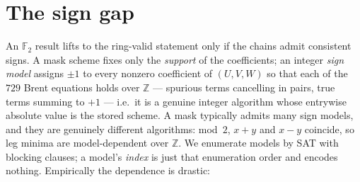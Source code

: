 \documentclass[11pt]{article}
\theoremstyle{definition}
\theoremstyle{remark}
\newcommand{\F}{\mathbb{F}}
\newcommand{\Z}{\mathbb{Z}}
\begin{document}
\section{The sign gap}\label{sec:signs}

An $\F_2$ result lifts to the ring-valid statement only if the
chains admit consistent signs.  A mask scheme fixes only the
\emph{support} of the coefficients; an integer \emph{sign model}
assigns $\pm1$ to every nonzero coefficient of $(U,V,W)$ so that each
of the $729$ Brent equations holds over $\Z$ --- spurious terms
cancelling in pairs, true terms summing to $+1$ --- i.e.\ it is a
genuine integer algorithm whose entrywise absolute value is the
stored scheme.  A mask typically admits many sign models, and they
are genuinely different algorithms: mod~$2$, $x+y$ and $x-y$
coincide, so leg minima are model-dependent over $\Z$.  We enumerate
models by SAT with blocking clauses; a model's \emph{index} is just
that enumeration order and encodes nothing.  Empirically the dependence is drastic:
\end{document}
